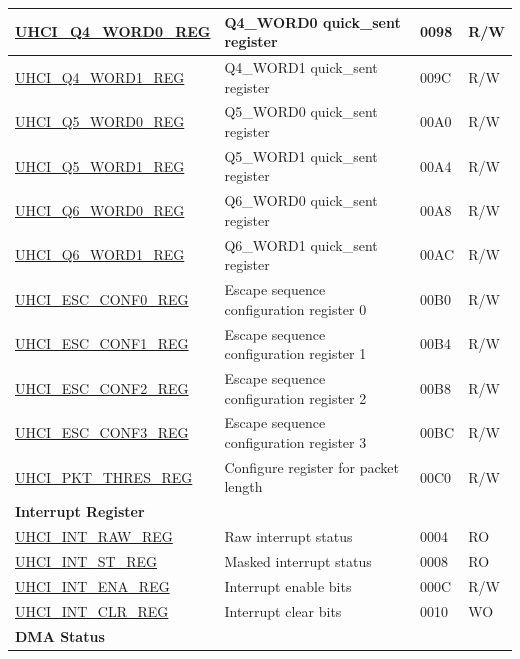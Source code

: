 \begin{longtable}{ | p{6cm} | p{7.2cm} | p{1.3cm} | p{1cm} | }
\hyperref[regdesc:UHCIQ4WORD0REG]{UHCI\_Q4\_WORD0\_REG} & Q4\_WORD0 quick\_sent register & \hexprefix{}0098 & R/W \\ \hline
\hyperref[regdesc:UHCIQ4WORD1REG]{UHCI\_Q4\_WORD1\_REG} & Q4\_WORD1 quick\_sent register & \hexprefix{}009C & R/W \\ \hline
\hyperref[regdesc:UHCIQ5WORD0REG]{UHCI\_Q5\_WORD0\_REG} & Q5\_WORD0 quick\_sent register & \hexprefix{}00A0 & R/W \\ \hline
\hyperref[regdesc:UHCIQ5WORD1REG]{UHCI\_Q5\_WORD1\_REG} & Q5\_WORD1 quick\_sent register & \hexprefix{}00A4 & R/W \\ \hline
\hyperref[regdesc:UHCIQ6WORD0REG]{UHCI\_Q6\_WORD0\_REG} & Q6\_WORD0 quick\_sent register & \hexprefix{}00A8 & R/W \\ \hline
\hyperref[regdesc:UHCIQ6WORD1REG]{UHCI\_Q6\_WORD1\_REG} & Q6\_WORD1 quick\_sent register & \hexprefix{}00AC & R/W \\ \hline
\hyperref[regdesc:UHCIESCCONF0REG]{UHCI\_ESC\_CONF0\_REG} & Escape sequence configuration register 0 & \hexprefix{}00B0 & R/W \\ \hline
\hyperref[regdesc:UHCIESCCONF1REG]{UHCI\_ESC\_CONF1\_REG} & Escape sequence configuration register 1 & \hexprefix{}00B4 & R/W \\ \hline
\hyperref[regdesc:UHCIESCCONF2REG]{UHCI\_ESC\_CONF2\_REG} & Escape sequence configuration register 2 & \hexprefix{}00B8 & R/W \\ \hline
\hyperref[regdesc:UHCIESCCONF3REG]{UHCI\_ESC\_CONF3\_REG} & Escape sequence configuration register 3 & \hexprefix{}00BC & R/W \\ \hline
\hyperref[regdesc:UHCIPKTTHRESREG]{UHCI\_PKT\_THRES\_REG} & Configure register for packet length & \hexprefix{}00C0 & R/W \\ \hline
\multicolumn{4}{|l|}{\textbf{Interrupt Register}} \\ \hline
\hyperref[regdesc:UHCIINTRAWREG]{UHCI\_INT\_RAW\_REG} & Raw interrupt status & \hexprefix{}0004 & RO \\ \hline
\hyperref[regdesc:UHCIINTSTREG]{UHCI\_INT\_ST\_REG} & Masked interrupt status & \hexprefix{}0008 & RO \\ \hline
\hyperref[regdesc:UHCIINTENAREG]{UHCI\_INT\_ENA\_REG} & Interrupt enable bits & \hexprefix{}000C & R/W \\ \hline
\hyperref[regdesc:UHCIINTCLRREG]{UHCI\_INT\_CLR\_REG} & Interrupt clear bits & \hexprefix{}0010 & WO \\ \hline
\multicolumn{4}{|l|}{\textbf{DMA Status}} \\ \hline

\end{longtable}
